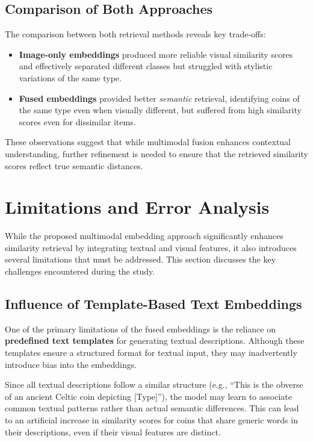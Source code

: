 \documentclass[nolibertine, english, algorithm, nomencl, minted]{ttlab-qualify}
\begin{document}
\subsection{Comparison of Both Approaches}
\label{subsec:comparison_retrieval}

The comparison between both retrieval methods reveals key trade-offs:

\begin{itemize}
    \item \textbf{Image-only embeddings} produced more reliable visual similarity scores and effectively separated different classes but struggled with stylistic variations of the same type.
    \item \textbf{Fused embeddings} provided better \textit{semantic} retrieval, identifying coins of the same type even when visually different, but suffered from high similarity scores even for dissimilar items.
\end{itemize}

These observations suggest that while multimodal fusion enhances contextual understanding, further refinement is needed to ensure that the retrieved similarity scores reflect true semantic distances.

\section{Limitations and Error Analysis}
\label{sec:limitations}

While the proposed multimodal embedding approach significantly enhances similarity retrieval by 
integrating textual and visual features, it also introduces several limitations that must be addressed. 
This section discusses the key challenges encountered during the study.

\subsection{Influence of Template-Based Text Embeddings}
\label{subsec:text_template_bias}

One of the primary limitations of the fused embeddings is the reliance 
on \textbf{predefined text templates} for generating textual descriptions. 
Although these templates ensure a structured format for textual input, 
they may inadvertently introduce bias into the embeddings.

Since all textual descriptions follow a similar structure (e.g., ``This is the obverse of an ancient Celtic coin depicting [Type]''), 
the model may learn to associate common textual patterns rather than actual semantic differences. 
This can lead to an artificial increase in similarity scores for coins that share generic words in their descriptions, 
even if their visual features are distinct.
\end{document}
